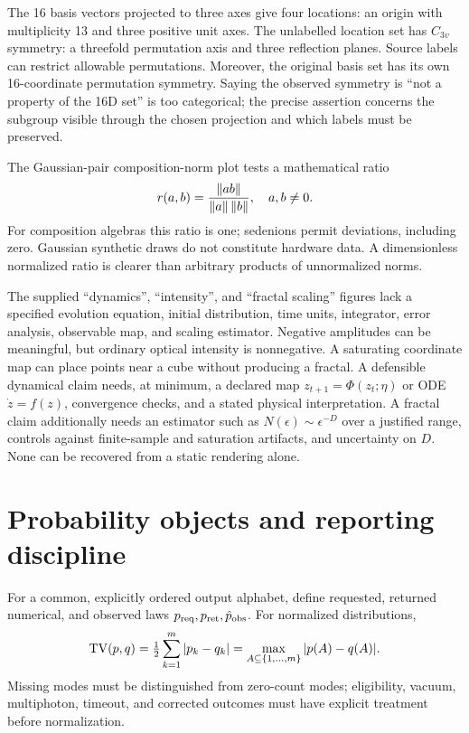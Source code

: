 \documentclass[11pt,a4paper]{article}
\begin{document}
The 16 basis vectors projected to three axes give four locations: an origin with multiplicity 13 and three positive unit axes. The unlabelled location set has $C_{3v}$ symmetry: a threefold permutation axis and three reflection planes. Source labels can restrict allowable permutations. Moreover, the original basis set has its own 16-coordinate permutation symmetry. Saying the observed symmetry is ``not a property of the 16D set'' is too categorical; the precise assertion concerns the subgroup visible through the chosen projection and which labels must be preserved.

The Gaussian-pair composition-norm plot tests a mathematical ratio
\begin{equation}
r(a,b)=\frac{\left\lVert ab\right\rVert}{\left\lVert a\right\rVert\left\lVert b\right\rVert},\quad a,b\ne0.
\end{equation}
For composition algebras this ratio is one; sedenions permit deviations, including zero. Gaussian synthetic draws do not constitute hardware data. A dimensionless normalized ratio is clearer than arbitrary products of unnormalized norms.

The supplied ``dynamics'', ``intensity'', and ``fractal scaling'' figures lack a specified evolution equation, initial distribution, time units, integrator, error analysis, observable map, and scaling estimator. Negative amplitudes can be meaningful, but ordinary optical intensity is nonnegative. A saturating coordinate map can place points near a cube without producing a fractal. A defensible dynamical claim needs, at minimum, a declared map $z_{t+1}=\Phi(z_t;\eta)$ or ODE $\dot z=f(z)$, convergence checks, and a stated physical interpretation. A fractal claim additionally needs an estimator such as $N(\epsilon)\sim\epsilon^{-D}$ over a justified range, controls against finite-sample and saturation artifacts, and uncertainty on $D$. None can be recovered from a static rendering alone.

\section{Probability objects and reporting discipline}
For a common, explicitly ordered output alphabet, define requested, returned numerical, and observed laws $p_{\rm req},p_{\rm ret},\hat p_{\rm obs}$. For normalized distributions,
\begin{equation}
\operatorname{TV}(p,q)=\tfrac12\sum_{k=1}^m|p_k-q_k|
=\max_{A\subseteq\{1,\ldots,m\}}|p(A)-q(A)|.
\end{equation}
Missing modes must be distinguished from zero-count modes; eligibility, vacuum, multiphoton, timeout, and corrected outcomes must have explicit treatment before normalization.
\end{document}
